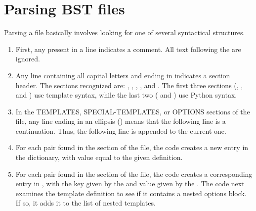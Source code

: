 \documentclass[letterpaper,10pt,english]{sphinxmanual}
\begin{document}
\section{Parsing BST files}
\label{\detokenize{developer_guide:parsing-bst-files}}
Parsing a  file basically involves looking for one of several syntactical structures.
\begin{enumerate}
\item {} 
First, any \sphinxcode{\sphinxupquote{\#}} present in a line indicates a comment. All text following the \sphinxcode{\sphinxupquote{\#}} are ignored.

\item {} 
Any line containing all capital letters and ending in \sphinxcode{\sphinxupquote{:}} indicates a section header. The sections recognized are: , , , , and . The first three sections (, , and ) use template syntax, while the last two (  and ) use Python syntax.

\item {} 
In the TEMPLATES, SPECIAL-TEMPLATES, or OPTIONS sections of the file, any line ending in an ellipsis () means that the following line is a continuation. Thus, the following line is appended to the current one.

\item {} 
For each  pair found in the  section of the file, the code creates a new entry in the  dictionary, with value equal to the given definition.

\item {} 
For each  pair found in the  section of the file, the code creates a corresponding entry in , with the key given by the  and value given by the . The code next examines the template definition to see if it contains a nested options block. If so, it adds it to the list of nested templates.


\end{enumerate}
\end{document}
